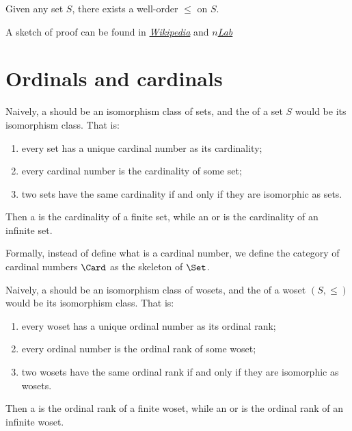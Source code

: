   \begin{thm}
    Given any set $S$, there exists a well-order $\leqslant$ on $S$.
  \end{thm}
  A sketch of proof can be found in \emph{\href{http://en.wikipedia.org/wiki/Well-ordering_theorem\#Statement_and_sketch_of_proof}{Wikipedia}} and \emph{\href{http://ncatlab.org/nlab/show/well-ordering+theorem\#statement_and_proof}{$n$Lab}}




\newpage\section{Ordinals and cardinals}
  Naively, a  should be an isomorphism class of sets, and the  of a set $S$ would be its isomorphism class. That is:
  \begin{enumerate}
    \item every set has a unique cardinal number as its cardinality;
    \item every cardinal number is the cardinality of some set;
    \item two sets have the same cardinality if and only if they are isomorphic as sets.
  \end{enumerate}
  Then a  is the cardinality of a finite set, while an  or  is the cardinality of an infinite set.

  Formally, instead of define what is a cardinal number, we define the category of cardinal numbers $\Card$ as the skeleton of $\Set$.

  Naively, a  should be an isomorphism class of wosets, and the  of a woset $(S,\leqslant)$ would be its isomorphism class. That is:
  \begin{enumerate}
    \item every woset has a unique ordinal number as its ordinal rank;
    \item every ordinal number is the ordinal rank of some woset;
    \item two wosets have the same ordinal rank if and only if they are isomorphic as wosets.
  \end{enumerate}
  Then a  is the ordinal rank of a finite woset, while an  or  is the ordinal rank of an infinite woset.

